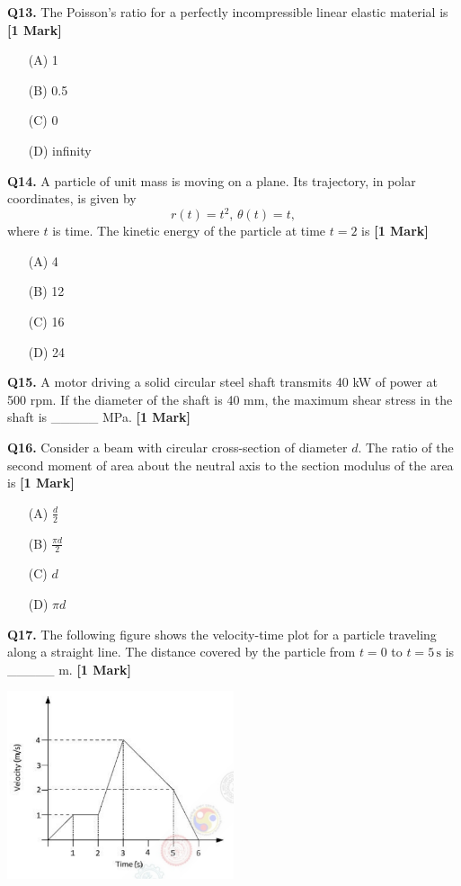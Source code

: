 \documentclass[11pt]{article}
\newcommand{\questiona}[2]{
    \noindent\textbf{Q#2.} #1 \hfill \textbf{[1 Mark]}
}
\begin{document}
\questiona{The Poisson's ratio for a perfectly incompressible linear elastic material is}{13}
\begin{enumerate}
    \item[(A)] 1  
    \item[(B)] 0.5  
    \item[(C)] 0  
    \item[(D)] infinity
\end{enumerate}
\vspace{0.5cm}

\questiona{A particle of unit mass is moving on a plane. Its trajectory, in polar coordinates, is given by  
\[ r(t) = t^2, \, \theta(t) = t, \]  
where \( t \) is time. The kinetic energy of the particle at time \( t = 2 \) is}{14}
\begin{enumerate}
    \item[(A)] 4  
    \item[(B)] 12  
    \item[(C)] 16  
    \item[(D)] 24
\end{enumerate}
\vspace{0.5cm}

\questiona{A motor driving a solid circular steel shaft transmits 40 kW of power at 500 rpm. If the diameter of the shaft is 40 mm, the maximum shear stress in the shaft is \_\_\_\_\_ MPa.}{15}
\vspace{0.5cm}

\questiona{Consider a beam with circular cross-section of diameter \( d \). The ratio of the second moment of area about the neutral axis to the section modulus of the area is}{16}
\begin{enumerate}
    \item[(A)] \(\frac{d}{2}\)  
    \item[(B)] \(\frac{\pi d}{2}\)  
    \item[(C)] \(d\)  
    \item[(D)] \(\pi d\)
\end{enumerate}
\vspace{0.5cm}

\questiona{The following figure shows the velocity-time plot for a particle traveling along a straight line. The distance covered by the particle from \( t = 0 \) to \( t = 5 \, \text{s} \) is \_\_\_\_\_ m.}{17}
\begin{center}
\includegraphics[width=0.5\textwidth]{figures/17.png}
\end{center}
\vspace{0.5cm}
\end{document}
